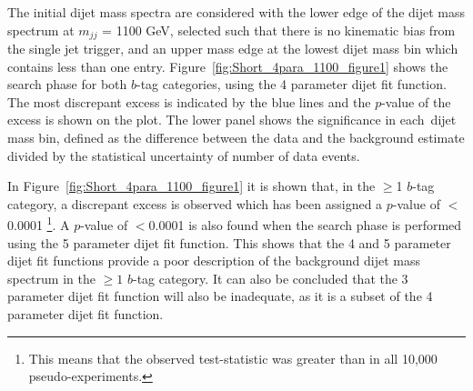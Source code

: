 The initial dijet mass spectra are considered with the lower edge of the dijet mass spectrum at $m_{jj}$ = 1100 GeV,
selected such that there is no kinematic bias from the single jet trigger,
and an upper mass edge at the lowest dijet mass bin which contains less than one entry.
Figure~\ref{fig:Short_4para_1100_figure1} shows the search phase
for both $b$-tag categories, using the 4 parameter dijet fit function.
The most discrepant excess is indicated by the blue lines and the \bh{} \mbox{$p$-value} of the excess is shown on the plot.
The lower panel shows the significance in each~dijet mass bin,
defined as the difference between the data and the background estimate divided by the statistical uncertainty of number of data events.

In Figure~\ref{fig:Short_4para_1100_figure1} it is shown that, in the $\geq$1 $b$-tag category,
a discrepant excess is observed which has been assigned a \bh{} \mbox{$p$-value} of $<$0.0001
\footnote{This means that the observed \bh{} test-statistic was greater than in all 10,000 pseudo-experiments.}.
A \bh{} \mbox{$p$-value} of $<$0.0001 is also found when the search phase is performed using the 5 parameter dijet fit function.
This shows that the 4 and 5 parameter dijet fit functions provide a poor description
of the background dijet mass spectrum in the $\geq1$ $b$-tag category.
It can also be concluded that the 3 parameter dijet fit function will also be inadequate, as it is a subset of the 4 parameter dijet fit function.

